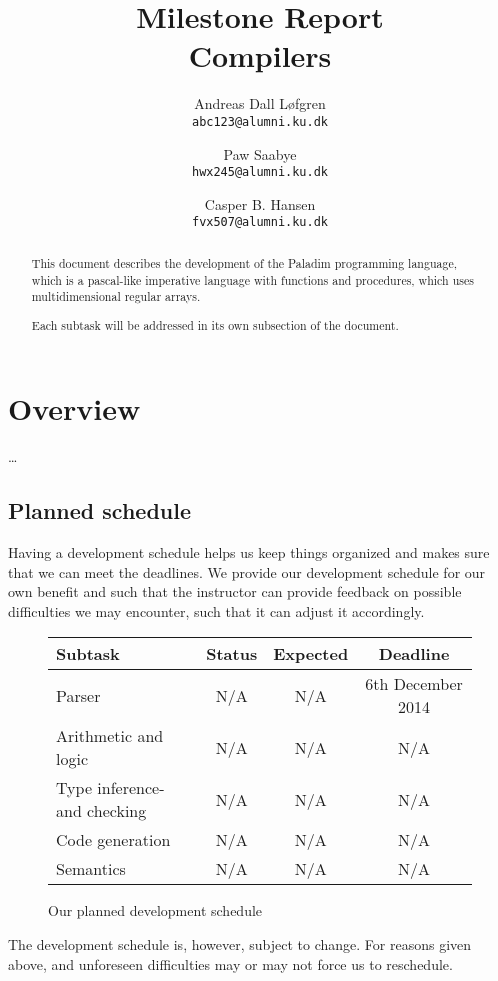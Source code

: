 \documentclass[11pt,a4paper]{article}
\title%
{%
	{\large Milestone Report}\\
	Compilers
}
\author%
{%
	Andreas Dall Løfgren\\
	{\tt abc123@alumni.ku.dk}
	\and
	Paw Saabye\\
	{\tt hwx245@alumni.ku.dk}
	\and
	Casper B. Hansen\\
	{\tt fvx507@alumni.ku.dk}
}
\begin{document}
\clearpage
\maketitle
\thispagestyle{empty}
\begin{multicols}{2}
\begin{abstract}
This document describes the development of the Paladim programming language,
which is a pascal-like imperative language with functions and procedures, which
uses multidimensional regular arrays.

Each subtask will be addressed in its own subsection of the document.
\end{abstract}
\vfill
\columnbreak%
\tableofcontents
\end{multicols}

\clearpage
\section{Overview}
\ldots

\subsection{Planned schedule}
Having a development schedule helps us keep things organized and makes sure
that we can meet the deadlines. We provide our development schedule for our
own benefit and such that the instructor can provide feedback on possible
difficulties we may encounter, such that it can adjust it accordingly.
\begin{figure}[H]
	\centering
	\begin{tabular}{|l|c|c|c|}
		\hline
		{\bf Subtask} & {\bf Status} & {\bf Expected} & {\bf Deadline} \\ \hline
		Parser & N/A & N/A & 6th December 2014 \\ \hline
		Arithmetic and logic & N/A & N/A & N/A \\ \hline
		Type inference- and checking & N/A & N/A & N/A \\ \hline
		Code generation & N/A & N/A & N/A \\ \hline
		Semantics & N/A & N/A & N/A \\ \hline
	\end{tabular}
	\label{table:schedule}
	\caption{Our planned development schedule}
\end{figure}
The development schedule is, however, subject to change. For reasons given
above, and unforeseen difficulties may or may not force us to reschedule.
\end{document}
